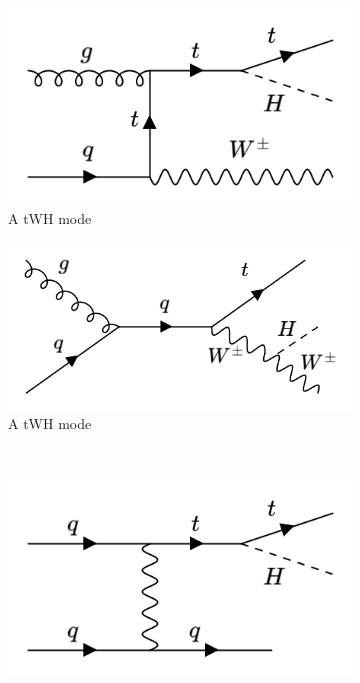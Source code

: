 \begin{figure}[htp]
  \centering
       \begin{subfigure}[b]{0.3\textwidth}
         \centering
         \includegraphics[width=\textwidth]{figures/theory_chapter/tWH1.png}
         \caption{A tWH mode}
         \label{fig:tWH1}
     \end{subfigure}
     \hfill
         \begin{subfigure}[b]{0.3\textwidth}
         \centering
         \includegraphics[width=\textwidth]{figures/theory_chapter/tWH2.png}
         \caption{A tWH mode}
         \label{fig:tWH2}
     \end{subfigure}
     \hfill 
     \\
        \begin{subfigure}[b]{0.3\textwidth}
         \centering
         \includegraphics[width=\textwidth]{figures/theory_chapter/tqH1.png}

\end{subfigure}
\end{figure}
